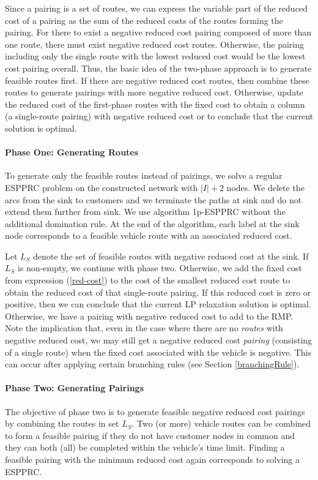Since a pairing is a set of routes, we can express the variable part of the 
reduced cost of a pairing as the sum of the reduced costs of the routes 
forming the pairing. For there to exist a negative reduced cost pairing 
composed of more than one route, there must exist negative reduced cost routes.
Otherwise, the pairing including only the single route with the lowest reduced
cost would be the lowest cost pairing overall.  Thus, the basic idea of the
two-phase approach is to generate feasible routes first. If there are negative reduced 
cost routes, then combine these routes to generate pairings with more negative reduced 
cost.  Otherwise, update the reduced cost of the first-phase routes with the fixed cost 
to obtain a column (a single-route pairing) with negative  reduced cost or to conclude 
that the current solution is optimal.  

\paragraph{Phase One: Generating Routes}
To generate only the feasible routes instead of pairings, we solve a regular 
ESPPRC problem on the constructed network with $|I| + 2$ nodes. We delete the
arcs from the sink to customers and we terminate the paths at sink and do
not extend them further from sink. We use algorithm 1p-ESPPRC without 
the additional domination rule. At the end of the algorithm, each label at the 
sink node corresponds to a feasible vehicle route with an associated reduced cost.  

Let $L_S$ denote the set of feasible routes with negative reduced cost at the
sink. If $L_S$ is non-empty, we continue with phase two. Otherwise, we add the
fixed cost from expression (\ref{red-cost}) to the cost of the smallest
reduced cost route to obtain the reduced cost of that single-route pairing.
If this reduced cost is zero or positive, then we can conclude that the current 
LP relaxation solution is optimal. Otherwise, we have a pairing with negative reduced 
cost to add to the RMP. Note the implication that, even in the case where there are no
\emph{routes} with negative reduced cost, we may still get a negative reduced
cost \emph{pairing} (consisting of a single route) when the fixed cost
associated with the vehicle is negative. This can occur after applying certain
branching rules (see Section \ref{branchingRule}).

\paragraph{Phase Two: Generating Pairings}
The objective of phase two is to generate feasible negative reduced cost pairings
by combining the routes in set $L_S$. Two (or more) vehicle routes can be combined to 
form a feasible pairing if they do not have customer nodes in common and they can both 
(all) be completed within the vehicle's time limit. Finding a feasible pairing with the 
minimum reduced cost again corresponds to solving a ESPPRC.

